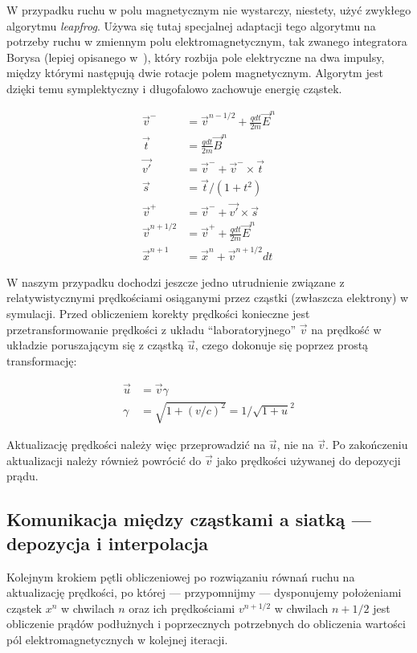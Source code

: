 W przypadku ruchu w polu magnetycznym nie wystarczy, niestety, użyć
zwykłego algorytmu \emph{leapfrog}. Używa się tutaj
specjalnej adaptacji tego algorytmu na potrzeby ruchu w zmiennym polu
elektromagnetycznym, tak zwanego integratora Borysa (lepiej opisanego w~\cite{birdsall}),
który rozbija pole elektryczne na dwa impulsy,
między którymi następują dwie rotacje polem magnetycznym. Algorytm jest
dzięki temu symplektyczny i długofalowo zachowuje energię cząstek.

\begin{align}
    \vec{v}^- &= \vec{v}^{n-1/2} + \frac{q dt}{2m} \vec{E}^n 
    \label{eqn:boris-pusher-start}\\
    \vec{t} &= \frac{q dt} {2 m} \vec{B}^n \\
    \vec{v'} &= \vec{v}^- + \vec{v}^- \times \vec{t} \\
    \vec{s} &= \vec{t} / {(1 + t^2)} \\
    \vec{v}^+ &= \vec{v}^- + \vec{v'} \times \vec{s} \\
    \vec{v}^{n+1/2} &= \vec{v}^+ + \frac{q dt}{2m} \vec{E}^n \\
    \vec{x}^{n+1} &= \vec{x}^{n} + \vec{v}^{n+1/2} dt
    \label{eqn:boris-pusher-end}
\end{align}

W naszym przypadku dochodzi jeszcze jedno utrudnienie związane z
relatywistycznymi prędkościami osiąganymi przez cząstki (zwłaszcza
elektrony) w symulacji. Przed obliczeniem korekty prędkości konieczne jest
przetransformowanie prędkości z układu ``laboratoryjnego'' $\vec{v}$ na
prędkość w układzie poruszającym się z cząstką $\vec{u}$, czego dokonuje
się poprzez prostą transformację:

\begin{align}
    \vec{u} &= \vec{v} \gamma \\
    \gamma &= \sqrt{1+{(v/c)}^2} = 1/\sqrt{1+u}^2
    \label{eqn:gamma-transformation}
\end{align}


Aktualizację prędkości należy więc przeprowadzić na $\vec{u}$, nie na
$\vec{v}$. Po zakończeniu
aktualizacji należy również powrócić do $\vec{v}$ jako prędkości używanej
do depozycji prądu.

\subsection{Komunikacja między cząstkami a siatką --- depozycja i interpolacja}

Kolejnym krokiem pętli obliczeniowej po rozwiązaniu równań ruchu na
aktualizację prędkości, po której --- przypomnijmy --- dysponujemy położeniami
cząstek $x^n$ w chwilach $n$ oraz ich prędkościami $v^{n+1/2}$ w chwilach
$n+1/2$  jest obliczenie prądów podłużnych i
poprzecznych potrzebnych do obliczenia wartości pól elektromagnetycznych w
kolejnej iteracji.

